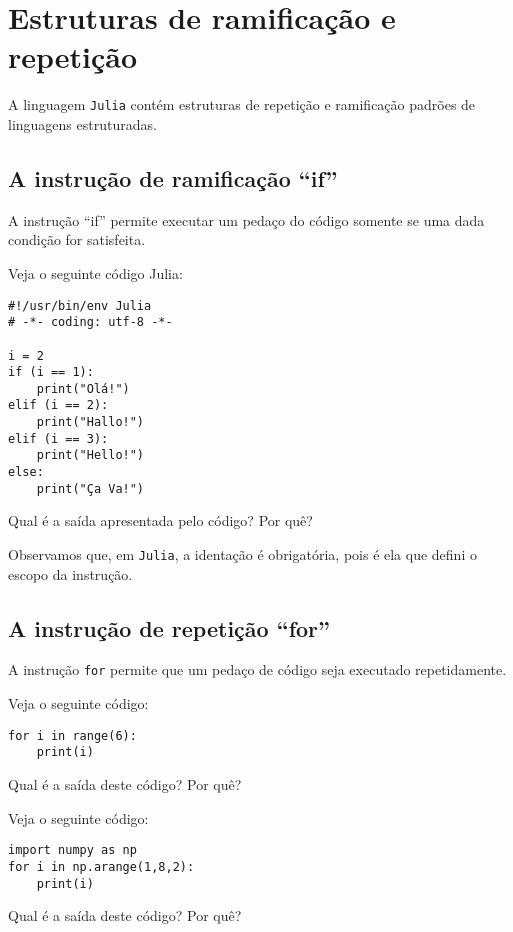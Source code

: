 \section{Estruturas de ramificação e repetição}

A linguagem \verb+Julia+ contém estruturas de repetição e ramificação padrões de linguagens estruturadas.

\subsection{A instrução de ramificação ``if''}

A instrução ``if'' permite executar um pedaço do código somente se uma dada condição for satisfeita.

\begin{ex}
  Veja o seguinte código Julia:
\begin{lstlisting}
#!/usr/bin/env Julia
# -*- coding: utf-8 -*-

i = 2
if (i == 1):
    print("Olá!")
elif (i == 2):
    print("Hallo!")
elif (i == 3):
    print("Hello!")
else:
    print("Ça Va!")
\end{lstlisting}
Qual é a saída apresentada pelo código? Por quê?
\end{ex}

Observamos que, em \verb+Julia+, a identação é obrigatória, pois é ela que defini o escopo da instrução.

\subsection{A instrução de repetição ``for''}

A instrução \verb+for+ permite que um pedaço de código seja executado repetidamente.

\begin{ex}
  Veja o seguinte código:
\begin{lstlisting}
for i in range(6):
    print(i)
\end{lstlisting}
Qual é a saída deste código? Por quê?
\end{ex}

\begin{ex}
  Veja o seguinte código:
\begin{lstlisting}
import numpy as np
for i in np.arange(1,8,2):
    print(i)
\end{lstlisting}
Qual é a saída deste código? Por quê?
\end{ex}

